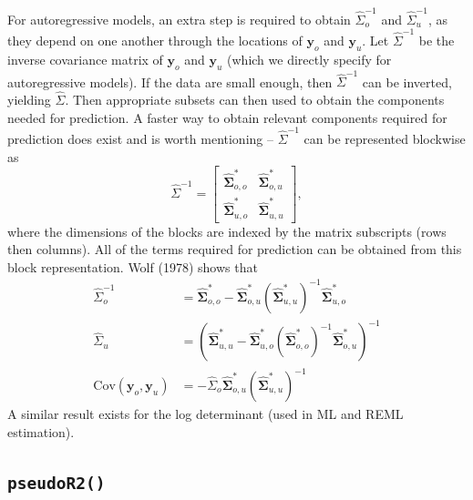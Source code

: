 \documentclass{article}
\begin{document}
For autoregressive models, an extra step is required to obtain
\(\hat{\Sigma}^{-1}_o\) and \(\hat{\Sigma}^{-1}_u\), as they depend on
one another through the locations of \(\mathbf{y}_o\) and
\(\mathbf{y}_u\). Let \(\hat{\Sigma}^{-1}\) be the inverse covariance
matrix of \(\mathbf{y}_o\) and \(\mathbf{y}_u\) (which we directly
specify for autoregressive models). If the data are small enough, then
\(\hat{\Sigma}^{-1}\) can be inverted, yielding \(\hat{\Sigma}\). Then
appropriate subsets can then used to obtain the components needed for
prediction. A faster way to obtain relevant components required for
prediction does exist and is worth mentioning -- \(\hat{\Sigma}^{-1}\)
can be represented blockwise as \begin{equation}\label{eq:auto_hw}
  \hat{\Sigma}^{-1} =
  \begin{bmatrix}
    \mathbf{\hat{\Sigma}}^{*}_{o, o} & \mathbf{\hat{\Sigma}}^{*}_{o, u} \\
    \mathbf{\hat{\Sigma}}^{*}_{u, o} & \mathbf{\hat{\Sigma}}^{*}_{u, u}
  \end{bmatrix},
\end{equation} where the dimensions of the blocks are indexed by the
matrix subscripts (rows then columns). All of the terms required for
prediction can be obtained from this block representation. Wolf (1978)
shows that \begin{equation}\label{eq:hw_forms}
  \begin{split}
    \hat{\Sigma}^{-1}_o & = \mathbf{\hat{\Sigma}}^{*}_{o, o} - \mathbf{\hat{\Sigma}}^{*}_{o, u} (\mathbf{\hat{\Sigma}}^{*}_{u, u})^{-1} \mathbf{\hat{\Sigma}}^{*}_{u, o} \\
    \hat{\Sigma}_u & = (\mathbf{\hat{\Sigma}}^{*}_{u, u} - \mathbf{\hat{\Sigma}}^{*}_{u, o} (\mathbf{\hat{\Sigma}}^{*}_{o, o})^{-1} \mathbf{\hat{\Sigma}}^{*}_{o, u})^{-1} \\
    \text{Cov}(\mathbf{y}_o, \mathbf{y}_u) & = - \hat{\Sigma}_o \mathbf{\hat{\Sigma}}^{*}_{o, u} (\mathbf{\hat{\Sigma}}^{*}_{u, u})^{-1}
  \end{split}
\end{equation} A similar result exists for the log determinant (used in
ML and REML estimation).

\hypertarget{pseudor2}{%
\subsection{\texorpdfstring{\texttt{pseudoR2()}}{pseudoR2()}}\label{pseudor2}}
\end{document}
